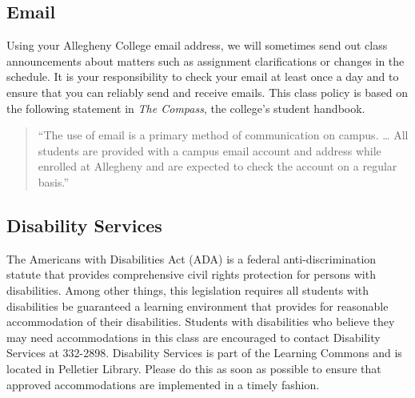 %

\vspace*{-.2in}
\subsection*{Email}

Using your Allegheny College email address, we will sometimes send out class announcements about matters such as
assignment clarifications or changes in the schedule. It is your responsibility to check your email at least once a day
and to ensure that you can reliably send and receive emails. This class policy is based on the following statement in
{\em The Compass}, the college's student handbook.

\vspace*{-.1in}
\begin{quote}
``The use of email is a primary method of communication on campus. \ldots
All students are provided with a campus email account and address while
enrolled at Allegheny and are expected to check the account on a regular
basis.''
\end{quote}
\vspace*{-.3in}

\subsection*{Disability Services}

The Americans with Disabilities Act (ADA) is a federal anti-discrimination statute that provides comprehensive civil
rights protection for persons with disabilities.  Among other things, this legislation requires all students with
disabilities be guaranteed a learning environment that provides for reasonable accommodation of their disabilities.
Students with disabilities who believe they may need accommodations in this class are encouraged to contact Disability
Services at 332-2898.  Disability Services is part of the Learning Commons and is located in Pelletier Library.
Please do this as soon as possible to ensure that approved accommodations are implemented in a timely fashion.

